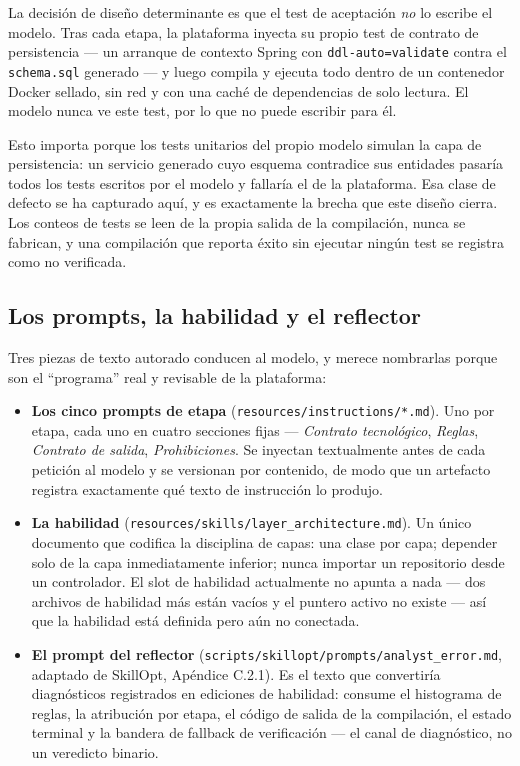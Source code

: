 \documentclass[11pt,a4paper]{article}
\begin{document}
La decisión de diseño determinante es que el test de aceptación \emph{no} lo escribe
el modelo. Tras cada etapa, la plataforma inyecta su propio test de contrato de
persistencia --- un arranque de contexto Spring con \texttt{ddl-auto=validate} contra
el \texttt{schema.sql} generado --- y luego compila y ejecuta todo dentro de un
contenedor Docker sellado, sin red y con una caché de dependencias de solo lectura. El
modelo nunca ve este test, por lo que no puede escribir para él.

Esto importa porque los tests unitarios del propio modelo simulan la capa de
persistencia: un servicio generado cuyo esquema contradice sus entidades pasaría todos
los tests escritos por el modelo y fallaría el de la plataforma. Esa clase de defecto
se ha capturado aquí, y es exactamente la brecha que este diseño cierra. Los conteos
de tests se leen de la propia salida de la compilación, nunca se fabrican, y una
compilación que reporta éxito sin ejecutar ningún test se registra como no verificada.

\subsection{Los prompts, la habilidad y el reflector}

Tres piezas de texto autorado conducen al modelo, y merece nombrarlas porque son el
``programa'' real y revisable de la plataforma:

\begin{itemize}[leftmargin=1.4em]
  \item \textbf{Los cinco prompts de etapa} (\texttt{resources/instructions/*.md}).
  Uno por etapa, cada uno en cuatro secciones fijas --- \emph{Contrato tecnológico},
  \emph{Reglas}, \emph{Contrato de salida}, \emph{Prohibiciones}. Se inyectan
  textualmente antes de cada petición al modelo y se versionan por contenido, de modo
  que un artefacto registra exactamente qué texto de instrucción lo produjo.
  \item \textbf{La habilidad} (\texttt{resources/skills/layer\_architecture.md}). Un
  único documento que codifica la disciplina de capas: una clase por capa; depender
  solo de la capa inmediatamente inferior; nunca importar un repositorio desde un
  controlador. El slot de habilidad actualmente no apunta a nada --- dos archivos de
  habilidad más están vacíos y el puntero activo no existe --- así que la habilidad
  está definida pero aún no conectada.
  \item \textbf{El prompt del reflector} (\texttt{scripts/skillopt/prompts/analyst\_error.md},
  adaptado de SkillOpt, Apéndice C.2.1). Es el texto que convertiría diagnósticos
  registrados en ediciones de habilidad: consume el histograma de reglas, la
  atribución por etapa, el código de salida de la compilación, el estado terminal y la
  bandera de fallback de verificación --- el canal de diagnóstico, no un veredicto
  binario.
\end{itemize}
\end{document}
